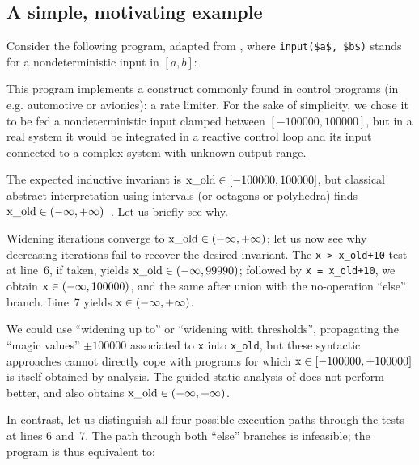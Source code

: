 \documentclass[preprint]{sigplanconf}
\begin{document}
\subsection{A simple, motivating example}
\label{subsec:rate_lim}
Consider the following program, adapted from \cite{Monniaux_Gonnord_SAS11}, where \lstinline|input($a$, $b$)| stands for a nondeterministic input in $[a,b]$:

This program implements a construct commonly found in control programs (in e.g. automotive or avionics): a rate limiter. For the sake of simplicity, we chose it to be fed a nondeterministic input clamped between $[-100000,100000]$, but in a real system it would be integrated in a reactive control loop and its input connected to a complex system with unknown output range.

The expected inductive invariant is $\lstinline|x_old| \in [-100000,100000]$, but classical abstract interpretation using intervals (or octagons or polyhedra) finds $\lstinline|x_old| \in (-\infty,+\infty)$~\citep{ASTREE_ESOP05}.
Let us briefly see why.

Widening iterations converge to $\lstinline|x_old| \in (-\infty,+\infty)$; let us now see why decreasing iterations fail to recover the desired invariant.
The \lstinline|x > x_old+10| test at line~6, if taken, yields $\lstinline|x_old|
\in (-\infty,99990)$; followed by \lstinline|x = x_old+10|, we obtain
$\lstinline|x| \in (-\infty,\allowbreak 100000)$, and the same after union with the no-operation ``else'' branch. Line~7 yields $\lstinline|x| \in (-\infty,+\infty)$.

We could use ``widening up to'' or ``widening with thresholds'', propagating the ``magic values'' $\pm 100000$ associated to \lstinline|x| into \mbox{\lstinline|x_old|,} but these syntactic approaches cannot directly cope with programs for which $\lstinline|x|  \in [-100000,+100000]$ is itself obtained by analysis.
The guided static analysis of \citet{DBLP:conf/sas/GopanR07} does not perform
better, and also obtains $\lstinline|x_old| \in (-\infty,+\infty)$.

In contrast, let us distinguish all four possible execution paths through the tests at lines 6 and~7. The path through both ``else'' branches is infeasible; the program is thus equivalent to:

\end{document}
